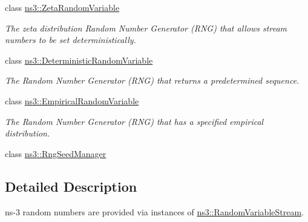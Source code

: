 \begin{DoxyCompactItemize}
class \hyperlink{classns3_1_1ZetaRandomVariable}{ns3\+::\+Zeta\+Random\+Variable}
\begin{DoxyCompactList}\small\item\em The zeta distribution Random Number Generator (R\+NG) that allows stream numbers to be set deterministically. \end{DoxyCompactList}\item 
class \hyperlink{classns3_1_1DeterministicRandomVariable}{ns3\+::\+Deterministic\+Random\+Variable}
\begin{DoxyCompactList}\small\item\em The Random Number Generator (R\+NG) that returns a predetermined sequence. \end{DoxyCompactList}\item 
class \hyperlink{classns3_1_1EmpiricalRandomVariable}{ns3\+::\+Empirical\+Random\+Variable}
\begin{DoxyCompactList}\small\item\em The Random Number Generator (R\+NG) that has a specified empirical distribution. \end{DoxyCompactList}\item 
class \hyperlink{classns3_1_1RngSeedManager}{ns3\+::\+Rng\+Seed\+Manager}
\end{DoxyCompactItemize}


\subsection{Detailed Description}
ns-\/3 random numbers are provided via instances of \hyperlink{classns3_1_1RandomVariableStream}{ns3\+::\+Random\+Variable\+Stream}. 


